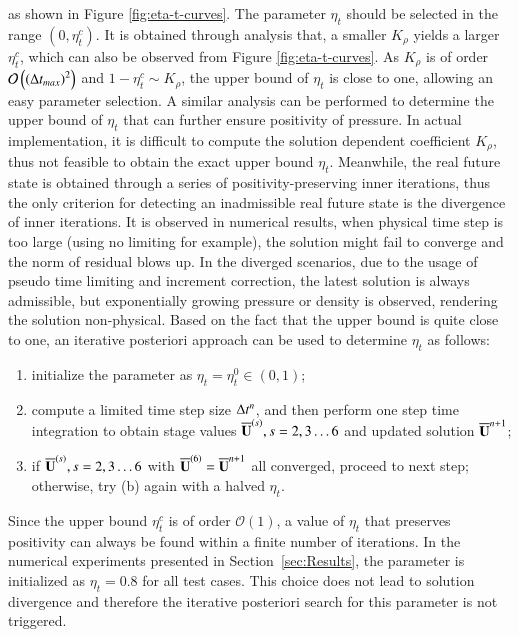 as shown in Figure \ref{fig:eta-t-curves}.
The parameter $\eta_t$ should be selected in the range $\left(0,\eta^c_t\right)$. 
It is obtained through analysis that, 
a smaller $K_\rho$ yields a larger $\eta^c_t$,
which can also be observed from Figure \ref{fig:eta-t-curves}. 
As $K_\rho$ is of 
order $\mathcal{O}\left(\left(\mathrm\Delta t_{max}\right)^2\right)$
and $1-\eta_t^c\sim K_\rho$,
the upper bound of $\eta_t$ is close to one, allowing an easy parameter selection. 
A similar analysis can be performed to determine the upper bound of $\eta_t$ that can further ensure positivity of pressure. 
In actual implementation, it is difficult to compute the solution dependent coefficient $K_\rho$, thus not feasible to obtain the exact upper bound $\eta_t$. 
Meanwhile, the real future state is 
obtained through a series of positivity-preserving inner iterations,
thus the only criterion for detecting an inadmissible real future 
state is the divergence of inner iterations.
It is observed in numerical results, when physical time step is 
too large (using no limiting for example), the solution might   
fail to converge and the norm of residual blows up. 
In the diverged scenarios, due to the usage of pseudo time limiting 
and increment correction, the latest solution is always admissible, 
but exponentially growing pressure or density is observed, rendering the 
solution non-physical. 
Based on the fact that the upper bound is quite close to one, an 
iterative posteriori approach can be used to determine $\eta_t$ as follows:
\begin{enumerate} [label=(\alph*)]
    \item initialize the parameter as $\eta_t= \eta^0_t \in \left(0,1\right)$;
    \item compute a limited time step size $\mathrm\Delta t^n$, and then perform one step time integration to obtain stage values $\overline{\mathbf{U}}^{(s)},s=2,3\dots6$ and updated solution $\overline{\mathbf{U}}^{n+1}$;
    \item if $\overline{\mathbf{U}}^{(s)},s=2,3\dots6$ with $\overline{\mathbf{U}}^{(6)}=\overline{\mathbf{U}}^{n+1}$ all converged, proceed to next step; otherwise, try (b) again with a halved $\eta_t$.
\end{enumerate}
Since the upper bound $\eta^c_t$ is of order $\mathcal{O}(1)$, a value of $\eta_t$ that preserves positivity can always be found within a finite number of iterations. 
In the numerical experiments presented in Section~\ref{sec:Results}, the parameter is initialized as $\eta_t = 0.8$ for all test cases. 
This choice does not lead to solution divergence and therefore the iterative posteriori search for this parameter is not triggered.

